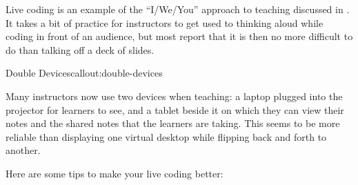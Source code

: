 Live coding is an example of the ``I/We/You'' approach to teaching
discussed in .  It takes a bit of practice
for instructors to get used to thinking aloud while coding in front of
an audience, but most report that it is then no more difficult to do
than talking off a deck of slides.

\begin{callout}{Double Devices}{callout:double-devices}

Many instructors now use two devices when teaching: a laptop plugged
into the projector for learners to see, and a tablet beside it on
which they can view their notes and the shared notes that the learners
are taking.  This seems to be more reliable than displaying one
virtual desktop while flipping back and forth to another.

\end{callout}

Here are some tips to make your live coding better:

